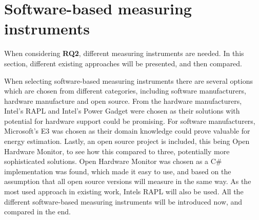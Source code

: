 \section{Software-based measuring instruments}\label{sec:measuring_instruments}

When considering \textbf{RQ2}, different measuring instruments are needed. In this section, different existing approaches will be presented, and then compared.

When selecting software-based measuring instruments there are several options which are chosen from different categories, including software manufacturers, hardware manufacture and open source. From the hardware manufacturers, Intel's RAPL and Intel's Power Gadget were chosen as their solutions with potential for hardware support could be promising. For software manufacturers, Microsoft's E3 was chosen as their domain knowledge could prove valuable for energy estimation. Lastly, an open source project is included, this being Open Hardware Monitor, to see how this compared to three, potentially more sophisticated solutions. Open Hardware Monitor was chosen as a C\# implementation was found, which made it easy to use, and based on the assumption that all open source versions will measure in the same way. As the most used approach in existing work, Intels RAPL will also be used. All the different software-based measuring instruments will be introduced now, and compared in the end.





